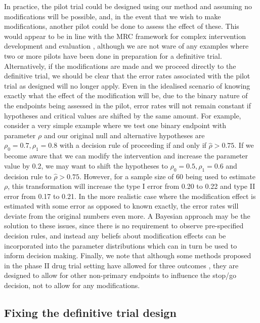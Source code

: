 \documentclass[AMA,STIX1COL]{WileyNJD-v2}
\begin{document}
In practice, the pilot trial could be designed using our method and assuming no modifications will be possible, and, in the event that we wish to make modifications, another pilot could be done to assess the effect of these. This would appear to be in line with the MRC framework for complex intervention development and evaluation \cite{Craig2008}, although we are not ware of any examples where two or more pilots have been done in preparation for a definitive trial. Alternatively, if the modifications are made and we proceed directly to the definitive trial, we should be clear that the error rates associated with the pilot trial as designed will no longer apply. Even in the idealised scenario of knowing exactly what the effect of the modification will be, due to the binary nature of the endpoints being assessed in the pilot, error rates will not remain constant if hypotheses and critical values are shifted by the same amount. For example, consider a very simple example where we test one binary endpoint with parameter $\rho$ and our original null and alternative hypotheses are $\rho_0 = 0.7, \rho_1 = 0.8$ with a decision rule of proceeding if and only if $\hat{\rho} > 0.75$. If we become aware that we can modify the intervention and increase the parameter value by 0.2, we may want to shift the hypotheses to $\rho_0 = 0.5, \rho_1 = 0.6$ and decision rule to $\hat{\rho} > 0.75$. However, for a sample size of 60 being used to estimate $\rho$, this transformation will increase the type I error from 0.20 to 0.22 and type II error from 0.17 to 0.21. In the more realistic case where the modification effect is estimated with some error as opposed to known exactly, the error rates will deviate from the original numbers even more. A Bayesian approach may be the solution to these issues, since there is no requirement to observe pre-specified decision rules, and instead any beliefs about modification effects can be incorporated into the parameter distributions which can in turn be used to inform decision making. Finally, we note that although some methods proposed in the phase II drug trial setting have allowed for three outcomes \cite{Sargent2001, Hong2007}, they are designed to allow for other non-primary endpoints to influence the stop/go decision, not to allow for any modifications.

\subsection{Fixing the definitive trial design}
\end{document}
